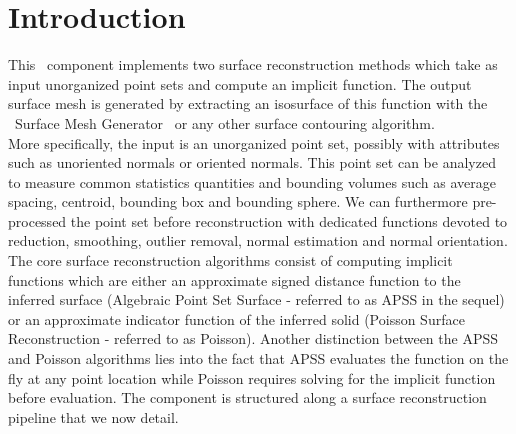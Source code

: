 \section{Introduction}

This \cgal\ component implements two surface reconstruction methods which take as input unorganized point sets and compute an implicit function. The output surface mesh is generated by extracting an isosurface of this function with the \cgal\ Surface Mesh Generator~\cite{cgal:ry-gsddrm-06} or any other surface contouring algorithm. \\

More specifically, the input is an unorganized point set, possibly with attributes such as unoriented normals or oriented normals. This point set can be analyzed to measure common statistics quantities and bounding volumes such as average spacing, centroid, bounding box and bounding sphere. We can furthermore pre-processed the point set before reconstruction with dedicated functions devoted to reduction, smoothing, outlier removal, normal estimation and normal orientation.\\

The core surface reconstruction algorithms consist of computing implicit functions which are either an approximate signed distance function to the inferred surface (Algebraic Point Set Surface - referred to as APSS in the sequel) or an approximate indicator function of the inferred solid (Poisson Surface Reconstruction - referred to as Poisson). Another distinction between the APSS and Poisson algorithms lies into the fact that APSS evaluates the function on the fly at any point location while Poisson requires solving for the implicit function before evaluation. The component is structured along a surface reconstruction pipeline that we now detail.

